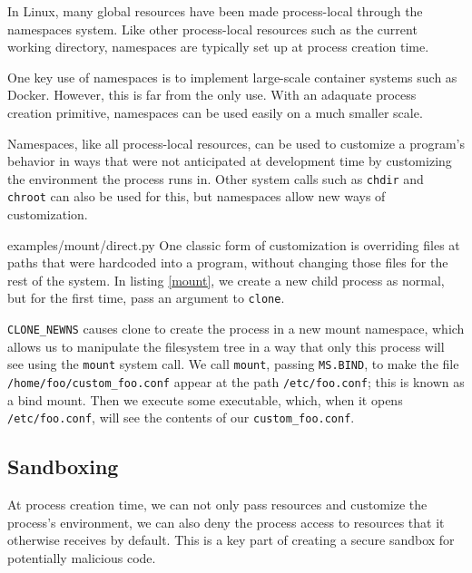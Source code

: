 \documentclass[letterpaper,twocolumn,10pt]{article}
\begin{document}
In Linux, many global resources have been made process-local
through the namespaces system.\cite{lwn_namespaces}
Like other process-local resources such as the current working directory,
namespaces are typically set up at process creation time.

One key use of namespaces is to implement large-scale container systems such as Docker.\cite{lwn_namespaces}
However, this is far from the only use.
With an adaquate process creation primitive,
namespaces can be used easily on a much smaller scale.

Namespaces, like all process-local resources,
can be used to customize a program's behavior
in ways that were not anticipated at development time
by customizing the environment the process runs in.\cite{plan9ns}
Other system calls such as \texttt{chdir} and \texttt{chroot} can also be used for this,
but namespaces allow new ways of customization.\cite{mount_namespaces}


{examples/mount/direct.py}
One classic form of customization
is overriding files at paths that were hardcoded into a program,
without changing those files for the rest of the system.
In listing \ref{mount},
we create a new child process as normal,
but for the first time,
pass an argument to \texttt{clone}.

\verb|CLONE_NEWNS| causes clone to create the process in a new mount namespace,
which allows us to manipulate the filesystem tree in a way that only this process will see
using the \texttt{mount} system call.\cite{mount_namespaces}\cite{clone}
We call \texttt{mount}, passing \texttt{MS.BIND}, to make the file \verb|/home/foo/custom_foo.conf|
appear at the path \verb|/etc/foo.conf|;
this is known as a bind mount.\cite{mount}
Then we execute some executable,
which, when it opens \verb|/etc/foo.conf|, will see the contents of our \verb|custom_foo.conf|.
\subsection{Sandboxing}
At process creation time,
we can not only pass resources and customize the process's environment,
we can also deny the process access to resources that it otherwise receives by default.
This is a key part of creating a secure sandbox for potentially malicious code.\cite{seccomp}\cite{firejail}\cite{gvisor}
\end{document}
